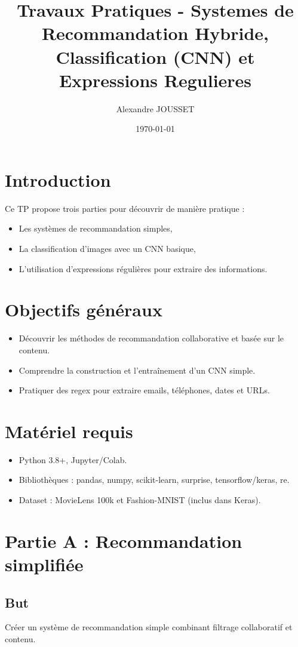 \documentclass[a4paper,12pt]{article}
\title{Travaux Pratiques - Systemes de Recommandation Hybride, Classification (CNN) et Expressions Regulieres}
\author{Alexandre JOUSSET}
\date{\today}
\begin{document}
\maketitle

\section*{Introduction}
Ce TP propose trois parties pour découvrir de manière pratique :  
\begin{itemize}
\item Les systèmes de recommandation simples,
\item La classification d'images avec un CNN basique,
\item L'utilisation d'expressions régulières pour extraire des informations.
\end{itemize}

\section*{Objectifs généraux}
\begin{itemize}
\item Découvrir les méthodes de recommandation collaborative et basée sur le contenu.
\item Comprendre la construction et l'entraînement d'un CNN simple.
\item Pratiquer des regex pour extraire emails, téléphones, dates et URLs.
\end{itemize}

\section*{Matériel requis}
\begin{itemize}
\item Python 3.8+, Jupyter/Colab.
\item Bibliothèques : pandas, numpy, scikit-learn, surprise, tensorflow/keras, re.
\item Dataset : MovieLens 100k et Fashion-MNIST (inclus dans Keras).
\end{itemize}

\section*{Partie A : Recommandation simplifiée}
\subsection*{But}
Créer un système de recommandation simple combinant filtrage collaboratif et contenu.
\end{document}
